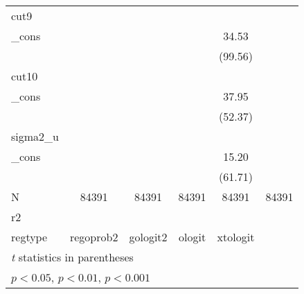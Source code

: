 {\begin{tabular}{l*{5}{c}}
\hline
cut9        &                     &                     &                     &                     &                     \\
\_cons      &                     &                     &                     &       34.53\sym{***}&                     \\
            &                     &                     &                     &     (99.56)         &                     \\
\hline
cut10       &                     &                     &                     &                     &                     \\
\_cons      &                     &                     &                     &       37.95\sym{***}&                     \\
            &                     &                     &                     &     (52.37)         &                     \\
\hline
sigma2\_u    &                     &                     &                     &                     &                     \\
\_cons      &                     &                     &                     &       15.20\sym{***}&                     \\
            &                     &                     &                     &     (61.71)         &                     \\
\hline
N           &       84391         &       84391         &       84391         &       84391         &       84391         \\
r2          &                     &                     &                     &                     &                     \\
regtype     &   regoprob2         &    gologit2         &      ologit         &    xtologit         &                     \\
\hline\hline
\multicolumn{6}{l}{\footnotesize \textit{t} statistics in parentheses}\\
\multicolumn{6}{l}{\footnotesize \sym{*} \(p<0.05\), \sym{**} \(p<0.01\), \sym{***} \(p<0.001\)}\\
\end{tabular}
}

